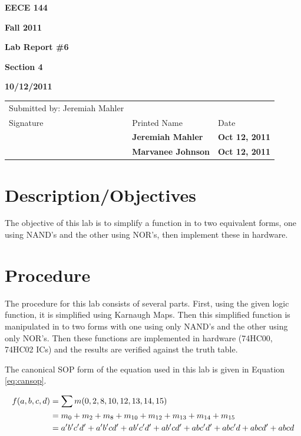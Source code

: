 \documentclass[12pt]{article}
\begin{document}

\centerline{\bf EECE 144}
\centerline{\bf Fall 2011}
\centerline{\bf}
\centerline{\bf Lab Report \#6}
\centerline{\bf Section 4}
\centerline{\bf 10/12/2011}

\begin{center}
\begin{tabularx}{\textwidth}[b]{X l l}
Submitted by: Jeremiah Mahler & & \\
Signature & Printed Name & Date \\
\hline
\multicolumn{1}{|X|}{} & \multicolumn{1}{|l|}{\bigstrut \bf Jeremiah Mahler} & \multicolumn{1}{|l|}{\bf Oct 12, 2011} \\
\hline
\multicolumn{1}{|X|}{} & \multicolumn{1}{|l|}{\bigstrut \bf Marvanee Johnson} & \multicolumn{1}{|l|}{\bf Oct 12, 2011} \\
\hline
\end{tabularx}
\end{center}

\section{Description/Objectives}

The objective of this lab is to simplify a function in to
two equivalent forms, one using NAND's and the other using NOR's,
then implement these in hardware.

\section{Procedure}
\label{sec:procedure}

The procedure for this lab consists of several parts.
First, using the given logic function, it is simplified
using Karnaugh Maps.
Then this simplified function is manipulated in to two
forms with one using only NAND's and the other using only NOR's.
Then these functions are implemented in hardware (74HC00, 74HC02 ICs)
and the results are verified against the truth table.

The canonical SOP form of the equation used in this lab is
given in Equation \ref{eq:cansop}.

\begin{align}
f(a, b, c, d) &= \sum m(0, 2, 8, 10, 12, 13, 14, 15) \label{eq:cansop} \\
	    &= m_0 + m_2 + m_8 + m_{10} + m_{12} + m_{13} + m_{14} + m_{15}\notag \\
		&= a'b'c'd' + a'b'cd' + ab'c'd' + ab'cd' + abc'd' + abc'd + abcd' + abcd \notag
\end{align}
\end{document}
